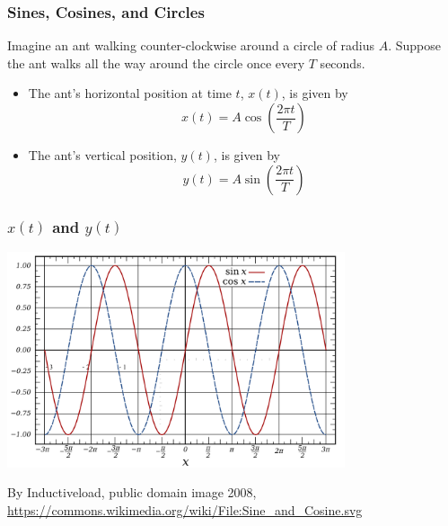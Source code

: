 \documentclass{beamer}
\begin{document}
\begin{frame}
  \frametitle{Sines, Cosines, and Circles}

  Imagine an ant walking counter-clockwise around a circle of radius $A$.
  Suppose the ant walks all the way around the circle once every $T$ seconds.
  \begin{itemize}
  \item The ant's horizontal position at time $t$, $x(t)$, is given by
    \[
    x(t) = A\cos\left(\frac{2\pi t}{T}\right)
    \]
  \item The ant's vertical position, $y(t)$, is given by
    \[
    y(t) = A\sin\left(\frac{2\pi t}{T}\right)
    \]
  \end{itemize}
\end{frame}


\begin{frame}
  \frametitle{$x(t)$ and $y(t)$}

  \centerline{\includegraphics[height=2.5in]{sine_and_cosine.png}}
  \begin{tiny}
    By Inductiveload, public domain image 2008,
    \url{https://commons.wikimedia.org/wiki/File:Sine_and_Cosine.svg}
  \end{tiny}
\end{frame}
\end{document}
